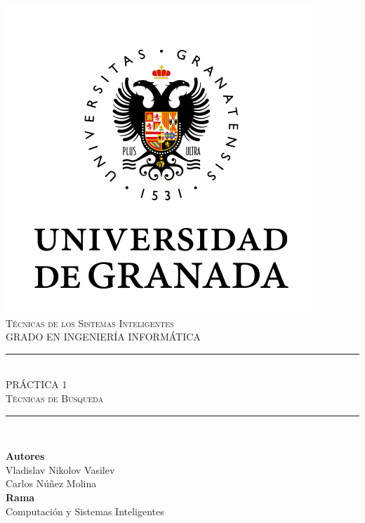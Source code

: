 \documentclass[11pt,a4paper]{article}
\newcommand{\asignatura}{Técnicas de los Sistemas Inteligentes}
\begin{document}

\begin{titlepage}

\begin{minipage}{\textwidth}

\centering

\includegraphics[scale=0.5]{img/ugr.png}\\

\textsc{\Large \asignatura{}\\[0.2cm]}
\textsc{GRADO EN INGENIERÍA INFORMÁTICA}\\[1cm]

\noindent\rule[-1ex]{\textwidth}{1pt}\\[1.5ex]
\textsc{{\Huge PRÁCTICA 1\\[0.5ex]}}
\textsc{{\Large Técnicas de Búsqueda\\}}
\noindent\rule[-1ex]{\textwidth}{2pt}\\[3.5ex]

\end{minipage}

\vspace{0.4cm}

\begin{minipage}{\textwidth}

\centering

\textbf{Autores}\\ {Vladislav Nikolov Vasilev}\\ {Carlos Núñez Molina}\\[2ex]
\textbf{Rama}\\ {Computación y Sistemas Inteligentes}\\[2ex]
\vspace{0.3cm}


\end{minipage}
\end{titlepage}
\end{document}
